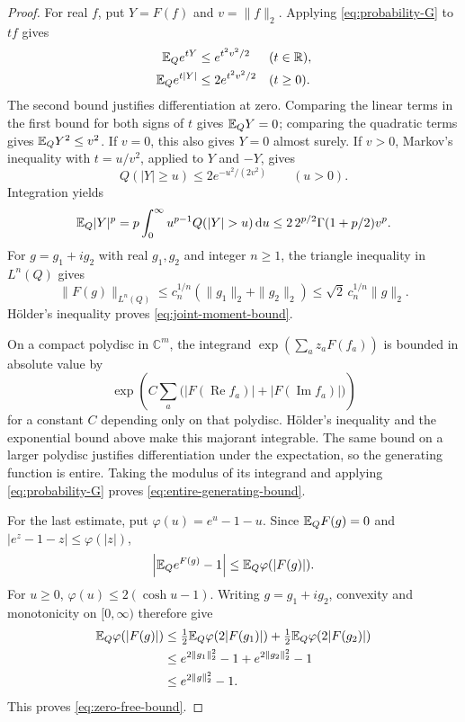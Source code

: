 \documentclass[11pt,letterpaper,reqno]{amsart}
\begin{document}
\begin{proof}
For real $f$, put $Y=F(f)$ and $v=\|f\|_2$. Applying
\eqref{eq:probability-G} to $tf$ gives
\begin{align*}
 \mathbb E_Q e^{tY}&\le e^{t^2v^2/2} &&(t\in\mathbb R),\\
 \mathbb E_Q e^{t|Y|}&\le2e^{t^2v^2/2} &&(t\ge0).
\end{align*}
The second bound justifies differentiation at zero. Comparing
the linear terms in the first bound for both signs of $t$
gives $\mathbb E_QY=0$; comparing the quadratic terms gives
$\mathbb E_QY^2\le v^2$. If $v=0$, this also gives $Y=0$ almost
surely. If $v>0$, Markov's inequality with $t=u/v^2$,
applied to $Y$ and $-Y$, gives
\[
 Q(|Y|\ge u)\le2e^{-u^2/(2v^2)}\qquad(u>0).
\]
Integration yields
\[
 \E_Q|Y|^p
 =p\int_0^\infty u^{p-1}Q(|Y|>u)\,\dd u
 \le2\,2^{p/2}\Gamma(1+p/2)v^p.
\]
For $g=g_1+ig_2$ with real $g_1,g_2$ and integer $n\ge1$,
the triangle inequality in $L^n(Q)$ gives
\[
 \|F(g)\|_{L^n(Q)}
 \le c_n^{1/n}(\|g_1\|_2+\|g_2\|_2)
 \le\sqrt2\,c_n^{1/n}\|g\|_2.
\]
H\"older's inequality proves \eqref{eq:joint-moment-bound}.

On a compact polydisc in $\mathbb C^m$, the integrand
$\exp(\sum_a z_aF(f_a))$ is bounded in absolute value by
\[
 \exp\left(C\sum_a
       \bigl(|F(\operatorname{Re}f_a)|
             +|F(\operatorname{Im}f_a)|\bigr)\right)
\]
for a constant $C$ depending only on that polydisc. H\"older's
inequality and the exponential bound above make this majorant
integrable. The same bound on a larger polydisc justifies
differentiation under the expectation, so the generating
function is entire. Taking the modulus of its integrand and
applying \eqref{eq:probability-G} proves
\eqref{eq:entire-generating-bound}.

For the last estimate, put $\varphi(u)=e^u-1-u$. Since
$\mathbb E_Q F(g)=0$ and $|e^z-1-z|\le\varphi(|z|)$,
\[
 \left|\mathbb E_Q e^{F(g)}-1\right|
 \le\mathbb E_Q\varphi(|F(g)|).
\]
For $u\ge0$, $\varphi(u)\le2(\cosh u-1)$. Writing
$g=g_1+ig_2$, convexity and monotonicity on $[0,\infty)$
therefore give
\begin{align*}
 \mathbb E_Q\varphi(|F(g)|)
 &\le\tfrac12\mathbb E_Q\varphi(2|F(g_1)|)
       +\tfrac12\mathbb E_Q\varphi(2|F(g_2)|)\\
 &\le e^{2\|g_1\|_2^2}-1+e^{2\|g_2\|_2^2}-1\\
 &\le e^{2\|g\|_2^2}-1.
\end{align*}
This proves \eqref{eq:zero-free-bound}.
\end{proof}
\end{document}
